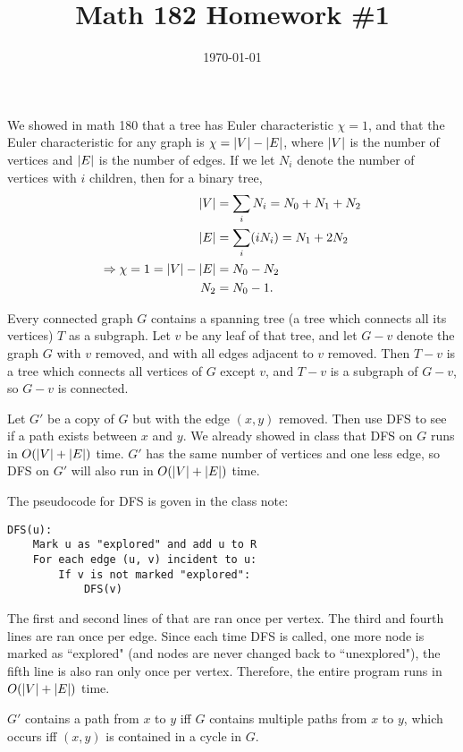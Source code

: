 \documentclass{article}
\date{\today}
\title{Math 182 Homework \#1}
\begin{document}
\maketitle

\begin{prob}
\end{prob}
We showed in math 180 that a tree has Euler characteristic $\chi=1$, and that the Euler characteristic for any graph is $\chi=\left\lvert V \right\rvert-\left\lvert E \right\rvert$, where $\left\lvert V \right\rvert$ is the number of vertices and $\left\lvert E \right\rvert$ is the number of edges. If we let $N_i$ denote the number of vertices with $i$ children, then for a binary tree,
\begin{align*}
    \left\lvert V \right\rvert &= \sum_i N_i = N_0 + N_1 + N_2 \\
    \left\lvert E \right\rvert &= \sum_i (i N_i) = N_1 + 2 N_2 \\
    \Rightarrow \chi = 1 = \left\lvert V \right\rvert - \left\lvert E \right\rvert &= N_0 - N_2 \\
    N_2 &= N_0 - 1.
\end{align*}

\bigskip
\par
\begin{prob}
\end{prob}
Every connected graph $G$ contains a spanning tree (a tree which connects all its vertices) $T$ as a subgraph. Let $v$ be any leaf of that tree, and let $G-v$ denote the graph $G$ with $v$ removed, and with all edges adjacent to $v$ removed. Then $T-v$ is a tree which connects all vertices of $G$ except $v$, and $T-v$ is a subgraph of $G-v$, so $G-v$ is connected.

\bigskip
\par
\begin{prob}
\end{prob}
Let $G'$ be a copy of $G$ but with the edge $(x,y)$ removed. Then use DFS to see if a path exists between $x$ and $y$. We already showed in class that DFS on $G$ runs in $O(\left\lvert V \right\rvert+\left\lvert E \right\rvert)$ time. $G'$ has the same number of vertices and one less edge, so DFS on $G'$ will also run in $O(\left\lvert V \right\rvert+\left\lvert E \right\rvert)$ time.
\par
The pseudocode for DFS is goven in the class note:
\begin{verbatim}
DFS(u):
    Mark u as "explored" and add u to R
    For each edge (u, v) incident to u:
        If v is not marked "explored":
            DFS(v)
\end{verbatim}
The first and second lines of that are ran once per vertex. The third and fourth lines are ran once per edge. Since each time DFS is called, one more node is marked as ``explored" (and nodes are never changed back to ``unexplored"), the fifth line is also ran only once per vertex. Therefore, the entire program runs in $O(\left\lvert V \right\rvert+\left\lvert E \right\rvert)$ time.
\par
$G'$ contains a path from $x$ to $y$ iff $G$ contains multiple paths from $x$ to $y$, which occurs iff $(x, y)$ is contained in a cycle in $G$.
\end{document}
